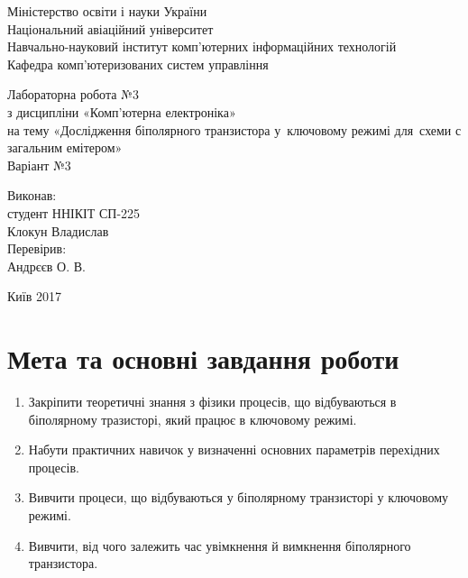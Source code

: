 \documentclass[a4paper,oneside,DIV=10,12pt]{scrartcl}
\begin{document}
	\begin{titlepage}
	\begin{center}
		Міністерство освіти і науки України\\
		Національний авіаційний університет\\
		Навчально-науковий інститут комп'ютерних інформаційних технологій\\
		Кафедра комп'ютеризованих систем управління

		\vspace{\fill}
		Лабораторна робота №3\\
		з дисципліни «Комп'ютерна електроніка»\\
		на тему «Дослідження біполярного транзистора у~ключовому режимі для~схеми с загальним емітером»\\
		Варіант №3
		
		\vspace{\fill}
		\begin{flushright}
		Виконав:\\
		студент ННІКІТ СП-225\\
		Клокун Владислав\\
		Перевірив:\\
		Андрєєв О. В.
		\end{flushright}
		
		Київ 2017
	\end{center}
	\end{titlepage}
	
	\section{Мета та основні завдання роботи}
		\begin{enumerate}
			\item Закріпити теоретичні знання з фізики процесів, що відбуваються в біполярному тразисторі, який працює в ключовому режимі.
			\item Набути практичних навичок у визначенні основних параметрів перехідних процесів.
			\item Вивчити процеси,  що відбуваються у біполярному транзисторі у ключовому режимі.
			\item Вивчити, від чого залежить час увімкнення й вимкнення біполярного транзистора.
		\end{enumerate}
	
\end{document}
